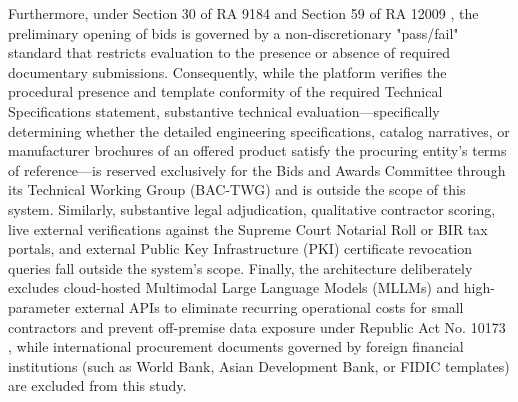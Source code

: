 Furthermore, under Section 30 of RA 9184 \cite{ref1} and Section 59 of RA 12009 \cite{ref2}, the preliminary opening of bids is governed by a non-discretionary "pass/fail" standard that restricts evaluation to the presence or absence of required documentary submissions.
Consequently, while the platform verifies the procedural presence and template conformity of the required Technical Specifications statement, substantive technical evaluation—specifically determining whether the detailed engineering specifications, catalog narratives, or manufacturer brochures of an offered product satisfy the procuring entity's terms of reference—is reserved exclusively for the Bids and Awards Committee through its Technical Working Group (BAC-TWG) and is outside the scope of this system.
Similarly, substantive legal adjudication, qualitative contractor scoring, live external verifications against the Supreme Court Notarial Roll or BIR tax portals, and external Public Key Infrastructure (PKI) certificate revocation queries fall outside the system's scope.
Finally, the architecture deliberately excludes cloud-hosted Multimodal Large Language Models (MLLMs) and high-parameter external APIs to eliminate recurring operational costs for small contractors and prevent off-premise data exposure under Republic Act No. 10173 \cite{ref6}, while international procurement documents governed by foreign financial institutions (such as World Bank, Asian Development Bank, or FIDIC templates) are excluded from this study.
